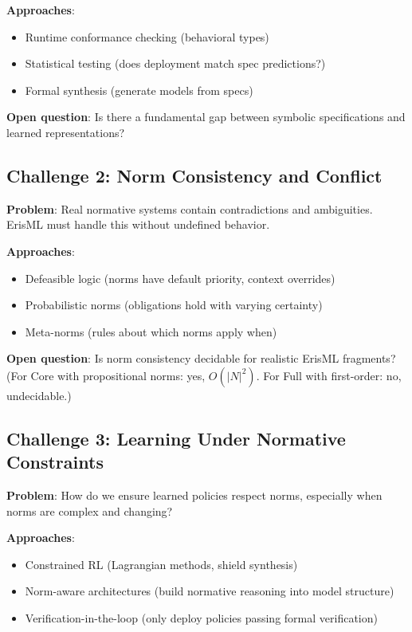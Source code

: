 \documentclass[conference]{IEEEtran}
\begin{document}
\textbf{Approaches}:
\begin{itemize}
\item Runtime conformance checking (behavioral types)
\item Statistical testing (does deployment match spec predictions?)
\item Formal synthesis (generate models from specs)
\end{itemize}

\textbf{Open question}: Is there a fundamental gap between symbolic
specifications and learned representations?

\subsection{Challenge 2: Norm Consistency and Conflict}

\textbf{Problem}: Real normative systems contain contradictions and
ambiguities. ErisML must handle this without undefined behavior.

\textbf{Approaches}:
\begin{itemize}
\item Defeasible logic (norms have default priority, context overrides)
\item Probabilistic norms (obligations hold with varying certainty)
\item Meta-norms (rules about which norms apply when)
\end{itemize}

\textbf{Open question}: Is norm consistency decidable for realistic
ErisML fragments? (For Core with propositional norms: yes,
$O(|N|^2)$. For Full with first-order: no, undecidable.)

\subsection{Challenge 3: Learning Under Normative Constraints}

\textbf{Problem}: How do we ensure learned policies respect norms,
especially when norms are complex and changing?

\textbf{Approaches}:
\begin{itemize}
\item Constrained RL (Lagrangian methods, shield synthesis)
\item Norm-aware architectures (build normative reasoning into model structure)
\item Verification-in-the-loop (only deploy policies passing formal verification)
\end{itemize}
\end{document}
